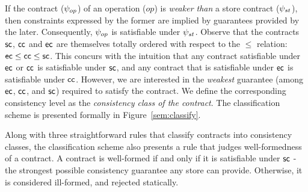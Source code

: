 If the contract ($\psi_{op}$) of an operation ($op$) is \emph{weaker
than} a store contract ($\psi_{st}$), then constraints expressed by the
former are implied by guarantees provided by the later. Consequently,
$\psi_{op}$ is satisfiable under $\psi_{st}$. Observe that the contracts
${\sf sc}$, ${\sf cc}$ and ${\sf ec}$ are themselves totally ordered with respect
to the $\le$ relation: ${\sf ec} \le {\sf cc} \le {\sf sc}$.  This concurs with
the intuition that any contract satisfiable under ${\sf ec}$ or ${\sf cc}$ is
satisfiable under ${\sf sc}$, and any contract that is satisfiable under
${\sf ec}$ is satisfiable under ${\sf cc}$. However, we are interested in the
\emph{weakest} guarantee (among ${\sf ec}$, ${\sf cc}$, and ${\sf sc}$) required
to satisfy the contract. We define the corresponding consistency level
as the \emph{consistency class of the contract}. The classification
scheme is presented formally in Figure~\ref{sem:classify}.

Along with three straightforward rules that classify contracts into
consistency classes, the classification scheme also presents a rule
that judges well-formedness of a contract. A contract is well-formed
if and only if it is satisfiable under ${\sf sc}$ - the strongest possible
consistency guarantee any store can provide. Otherwise, it is
considered ill-formed, and rejected statically.
